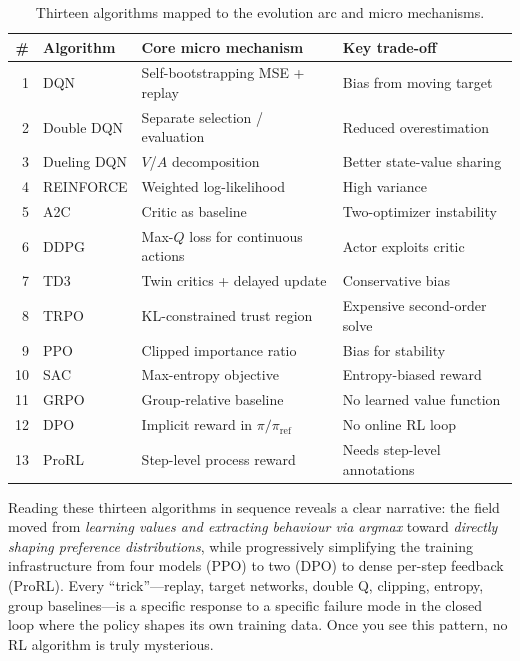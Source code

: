 \begin{table}[htbp]
\centering
\caption{Thirteen algorithms mapped to the evolution arc and micro mechanisms.}
\small
\begin{tabular}{@{}rlll@{}}
\toprule
\textbf{\#} & \textbf{Algorithm} & \textbf{Core micro mechanism} & \textbf{Key trade-off} \\
\midrule
1  & DQN        & Self-bootstrapping MSE + replay            & Bias from moving target \\
2  & Double DQN & Separate selection / evaluation             & Reduced overestimation \\
3  & Dueling DQN & $V$/$A$ decomposition                     & Better state-value sharing \\
4  & REINFORCE  & Weighted log-likelihood                     & High variance \\
5  & A2C        & Critic as baseline                          & Two-optimizer instability \\
6  & DDPG       & Max-$Q$ loss for continuous actions          & Actor exploits critic \\
7  & TD3        & Twin critics + delayed update               & Conservative bias \\
8  & TRPO       & KL-constrained trust region                 & Expensive second-order solve \\
9  & PPO        & Clipped importance ratio                    & Bias for stability \\
10 & SAC        & Max-entropy objective                       & Entropy-biased reward \\
11 & GRPO       & Group-relative baseline                     & No learned value function \\
12 & DPO        & Implicit reward in $\pi/\pi_{\text{ref}}$  & No online RL loop \\
13 & ProRL      & Step-level process reward                   & Needs step-level annotations \\
\bottomrule
\end{tabular}
\end{table}

Reading these thirteen algorithms in sequence reveals a clear narrative: the field moved from \emph{learning values and extracting behaviour via argmax} toward \emph{directly shaping preference distributions}, while progressively simplifying the training infrastructure from four models (PPO) to two (DPO) to dense per-step feedback (ProRL).
Every ``trick''---replay, target networks, double Q, clipping, entropy, group baselines---is a specific response to a specific failure mode in the closed loop where the policy shapes its own training data.
Once you see this pattern, no RL algorithm is truly mysterious.
